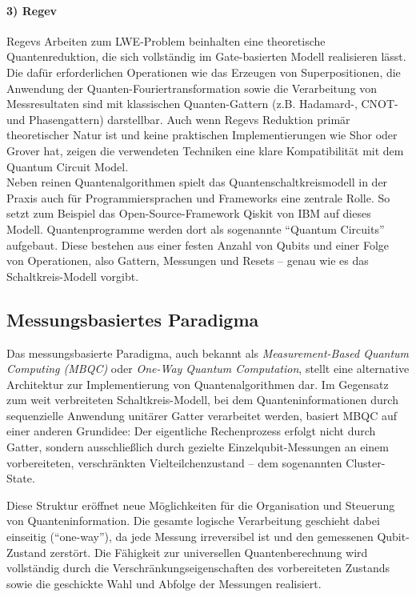\paragraph*{3) Regev}
Regevs Arbeiten zum LWE-Problem beinhalten eine theoretische Quantenreduktion, die sich vollständig im Gate-basierten Modell realisieren lässt. Die dafür erforderlichen Operationen wie das Erzeugen von Superpositionen, die Anwendung der Quanten-Fouriertransformation sowie die Verarbeitung von Messresultaten sind mit klassischen Quanten-Gattern (z.B. Hadamard-, CNOT- und Phasengattern) darstellbar. Auch wenn Regevs Reduktion primär theoretischer Natur ist und keine praktischen Implementierungen wie Shor oder Grover hat, zeigen die verwendeten Techniken eine klare Kompatibilität mit dem Quantum Circuit Model. \autocite{regev_lattices_2024}
\\

Neben reinen Quantenalgorithmen spielt das Quantenschaltkreismodell in der Praxis auch für Programmiersprachen und Frameworks eine zentrale Rolle. So setzt zum Beispiel das Open-Source-Framework Qiskit von IBM auf dieses Modell. Quantenprogramme werden dort als sogenannte \enquote{Quantum Circuits} aufgebaut. Diese bestehen aus einer festen Anzahl von Qubits und einer Folge von Operationen, also Gattern, Messungen und Resets – genau wie es das Schaltkreis-Modell vorgibt.

\subsection{Messungsbasiertes Paradigma}
Das messungsbasierte Paradigma, auch bekannt als \textit{Measurement-Based Quantum Computing (MBQC)} oder \textit{One-Way Quantum Computation}, stellt eine alternative Architektur zur Implementierung von Quantenalgorithmen dar. Im Gegensatz zum weit verbreiteten Schaltkreis-Modell, bei dem Quanteninformationen durch sequenzielle Anwendung unitärer Gatter verarbeitet werden, basiert MBQC auf einer anderen Grundidee: Der eigentliche Rechenprozess erfolgt nicht durch Gatter, sondern ausschließlich durch gezielte Einzelqubit-Messungen an einem vorbereiteten, verschränkten Vielteilchenzustand – dem sogenannten Cluster-State.

Diese Struktur eröffnet neue Möglichkeiten für die Organisation und Steuerung von Quanteninformation. Die gesamte logische Verarbeitung geschieht dabei einseitig (\enquote{one-way}), da jede Messung irreversibel ist und den gemessenen Qubit-Zustand zerstört. Die Fähigkeit zur universellen Quantenberechnung wird vollständig durch die Verschränkungseigenschaften des vorbereiteten Zustands sowie die geschickte Wahl und Abfolge der Messungen realisiert. \autocite[2-4]{briegelMeasurementbasedQuantumComputation2009}

